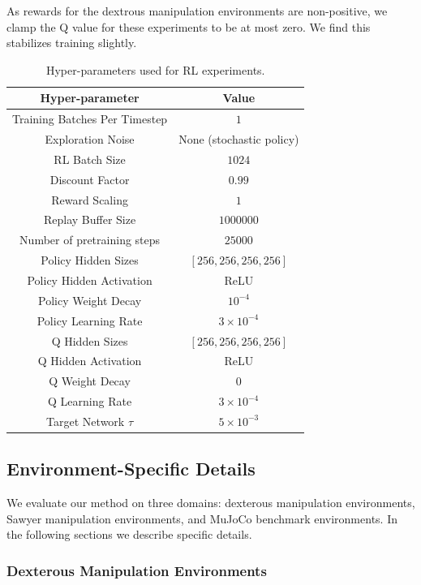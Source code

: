 \documentclass[conference]{IEEEtran}
\begin{document}
As rewards for the dextrous manipulation environments are non-positive, we clamp the Q value for these experiments to be at most zero. We find this stabilizes training slightly.

\begin{table}
    \centering
    \begin{tabular}{c|c}
    \hline
    \textbf{Hyper-parameter} & \textbf{Value} \\
    \hline
    Training Batches Per Timestep & $1$\\
    Exploration Noise & None (stochastic policy) \\
    RL Batch Size & $1024$ \\
    Discount Factor & $0.99$\\
    Reward Scaling & $1$\\
    Replay Buffer Size & $1000000$\\
    Number of pretraining steps & $25000$ \\
    Policy Hidden Sizes & $[256, 256, 256, 256]$\\
    Policy Hidden Activation & ReLU\\
    Policy Weight Decay & $10^{-4}$ \\
    Policy Learning Rate & $3 \times 10^{-4}$\\
    Q Hidden Sizes & $[256, 256, 256, 256]$\\
    Q Hidden Activation & ReLU\\
    Q Weight Decay & $0$ \\
    Q Learning Rate & $3 \times 10^{-4}$\\
    Target Network $\tau$ & $5\times10^{-3}$ \\
    \hline
    \end{tabular}
\caption{Hyper-parameters used for RL experiments.}
\label{table:rl-hyperparams}
\end{table}

\subsection{Environment-Specific Details} \label{sec:environment_impl}

We evaluate our method on three domains: dexterous manipulation environments, Sawyer manipulation environments, and MuJoCo benchmark environments. In the following sections we describe specific details.

\subsubsection{Dexterous Manipulation Environments}
\end{document}
